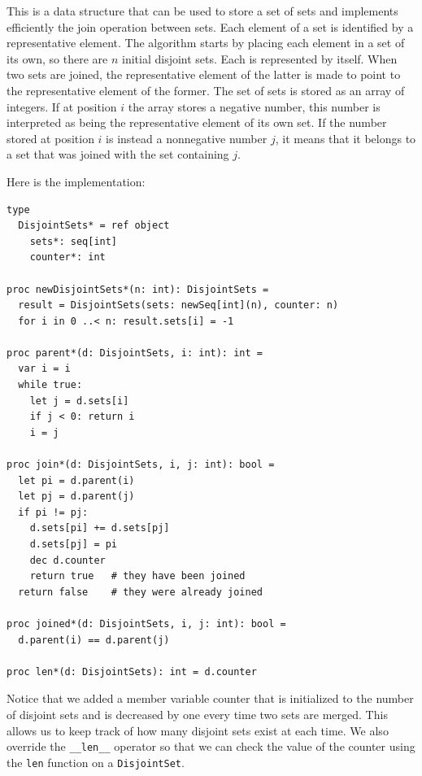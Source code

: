 \documentclass[justified, sixbynine]{tufte-book}
\def\ft{\small\tt}
\theoremstyle{plain}%
\newtheorem * {corollary}{Corollary}
\theoremstyle{definition}
\theoremstyle{remark}
\newtheorem * {remark}{Remark}
\newtheorem * {note}{Note}
\begin{document}
\begin{fullwidth}
This is a data structure that can be used to store a set of sets and implements efficiently the join operation between sets.
Each element of a set is identified by a representative element. The algorithm starts by placing each element in a set of its own, so there are $n$ initial disjoint sets. Each is represented by itself. When two sets are joined, the representative element of the latter is made to point to the representative element of the former. The set of sets is stored as an array of integers. If at position $i$ the array stores a negative number, this number is interpreted as being the representative element of its own set. If the number stored at position $i$ is instead a nonnegative number $j$, it means that it belongs to a set that was joined with the set containing $j$.

Here is the implementation:


\begin{lstlisting}[caption={in file: {\ft nlib/graph.nim}}]
type
  DisjointSets* = ref object
    sets*: seq[int]
    counter*: int

proc newDisjointSets*(n: int): DisjointSets =
  result = DisjointSets(sets: newSeq[int](n), counter: n)
  for i in 0 ..< n: result.sets[i] = -1

proc parent*(d: DisjointSets, i: int): int =
  var i = i
  while true:
    let j = d.sets[i]
    if j < 0: return i
    i = j

proc join*(d: DisjointSets, i, j: int): bool =
  let pi = d.parent(i)
  let pj = d.parent(j)
  if pi != pj:
    d.sets[pi] += d.sets[pj]
    d.sets[pj] = pi
    dec d.counter
    return true   # they have been joined
  return false    # they were already joined

proc joined*(d: DisjointSets, i, j: int): bool =
  d.parent(i) == d.parent(j)

proc len*(d: DisjointSets): int = d.counter
\end{lstlisting}

Notice that we added a member variable counter that is initialized to the number of disjoint sets and is decreased by one every time two sets are merged. This allows us to keep track of how many disjoint sets exist at each time. We also override the {\ft \_\_len\_\_} operator so that we can check the value of the counter using the {\ft len} function on a {\ft DisjointSet}.


\end{fullwidth}
\end{document}
